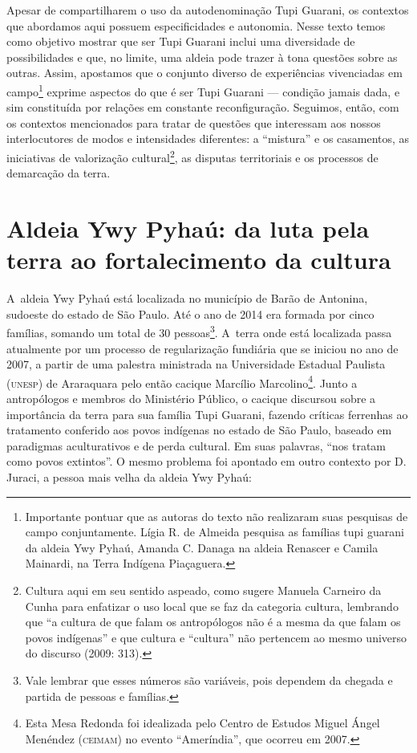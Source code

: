 Apesar de compartilharem o uso da autodenominação Tupi Guarani, os
contextos que abordamos aqui possuem especificidades e autonomia. Nesse
texto temos como objetivo mostrar que ser Tupi Guarani inclui uma
diversidade de possibilidades e que, no limite, uma aldeia pode trazer
à tona questões sobre as outras. Assim, apostamos que o conjunto
diverso de experiências vivenciadas em campo\footnote{Importante
pontuar que as autoras do texto não realizaram suas pesquisas de campo
conjuntamente. Lígia R. de Almeida pesquisa as famílias tupi
guarani da aldeia Ywy Pyhaú, Amanda C. Danaga na aldeia Renascer e
Camila Mainardi, na Terra Indígena Piaçaguera.} exprime aspectos do
que é ser Tupi Guarani --- condição jamais dada, e sim constituída por
relações em constante reconfiguração. Seguimos, então, com os contextos
mencionados para tratar de questões que interessam aos nossos
interlocutores de modos e intensidades diferentes: a ``mistura'' e os
casamentos, as iniciativas de valorização cultural\footnote{Cultura
aqui em seu sentido aspeado, como sugere Manuela Carneiro da Cunha para
enfatizar o uso local que se faz da categoria cultura, lembrando que ``a
cultura de que falam os antropólogos não é a mesma da que falam os
povos indígenas'' e que cultura e ``cultura'' não pertencem ao mesmo
universo do discurso (2009: 313).}, as disputas territoriais e os
processos de demarcação da terra. 

\section{Aldeia Ywy Pyhaú: da luta pela terra ao fortalecimento da cultura}

A~aldeia Ywy Pyhaú está localizada no município de Barão de Antonina,
sudoeste do estado de São Paulo. Até o ano de 2014 era formada por
cinco famílias, somando um total de 30 pessoas\footnote{Vale lembrar
que esses números são variáveis, pois dependem da chegada e partida de
pessoas e famílias.}. A~terra onde está localizada passa atualmente por
um processo de regularização fundiária que se iniciou no ano de 2007, a
partir de uma palestra ministrada na Universidade Estadual Paulista
(\textsc{unesp}) de Araraquara pelo então cacique Marcílio
Marcolino\footnote{Esta Mesa Redonda foi idealizada pelo Centro de
Estudos Miguel Ángel Menéndez (\textsc{ceimam}) no evento ``Ameríndia'', que ocorreu
em 2007.}. Junto a antropólogos e membros do Ministério Público, o
cacique discursou sobre a importância da terra para sua família Tupi
Guarani, fazendo críticas ferrenhas ao tratamento conferido aos povos
indígenas no estado de São Paulo, baseado em paradigmas aculturativos e
de perda cultural. Em suas palavras, ``nos tratam como povos extintos''. O
mesmo problema foi apontado em outro contexto por D. Juraci, a pessoa
mais velha da aldeia Ywy Pyhaú:

